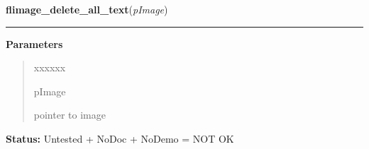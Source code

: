 \hspace{.8\funcindent}\begin{boxedminipage}{\funcwidth}

    \raggedright \textbf{flimage\_delete\_all\_text}(\textit{pImage})

    \vspace{-1.5ex}

    \rule{\textwidth}{0.5\fboxrule}
\setlength{\parskip}{2ex}
\setlength{\parskip}{1ex}
      \textbf{Parameters}
      \vspace{-1ex}

      \begin{quote}
        \begin{Ventry}{xxxxxx}

          \item[pImage]

          pointer to image

        \end{Ventry}

      \end{quote}

\textbf{Status:} Untested + NoDoc + NoDemo = NOT OK



    \end{boxedminipage}

    \label{xformslib:library:flimage_add_marker}

    \vspace{0.5ex}


